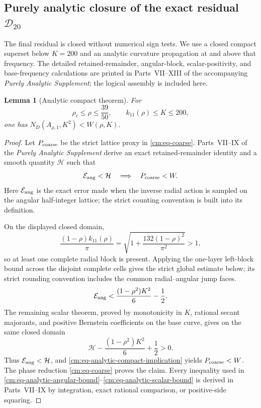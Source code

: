 \documentclass[11pt]{article}
\numberwithin{equation}{section}
\newtheorem{lemma}[theorem]{Lemma}
\theoremstyle{definition}
\theoremstyle{remark}
\begin{document}
\subsection{Purely analytic closure of the exact residual
\texorpdfstring{\(\mathcal D_{20}\)}{D20}}

The final residual is closed without numerical sign tests.  We use a
closed compact superset below \(K=200\) and an analytic curvature
propagation at and above that frequency.  The detailed retained-remainder,
angular-block, scalar-positivity, and base-frequency calculations are
printed in Parts~VII--XIII of the accompanying \emph{Purely Analytic
Supplement}; the logical assembly is included here.

\begin{lemma}[Analytic compact theorem]
\label{cm:lem-compact-certificate}
For
\[
 \rho_c\leq\rho\leq\frac{39}{50},
 \qquad
 k_{11}(\rho)\leq K\leq200,
\]
one has \(N_D(A_{\rho,1},K^2)<W(\rho,K)\).
\end{lemma}

\begin{proof}
Let \(P_{\rm coarse}\) be the strict lattice proxy in
\eqref{cm:eq-coarse}.  Parts~VII--IX of the \emph{Purely Analytic
Supplement} derive an exact retained-remainder identity and a smooth
quantity \(\mathcal H\) such that
\begin{equation}
 \mathcal E_{\rm ang}<\mathcal H
 \quad\Longrightarrow\quad
 P_{\rm coarse}<W.
 \label{cm:eq-analytic-compact-implication}
\end{equation}
Here \(\mathcal E_{\rm ang}\) is the exact error made when the inverse
radial action is sampled on the angular half-integer lattice; the strict
counting convention is built into its definition.

On the displayed closed domain,
\[
 \frac{(1-\rho)k_{11}(\rho)}{\pi}
 =\sqrt{1+\frac{132(1-\rho)^2}{\pi^2}}>1,
\]
so at least one complete radial block is present.  Applying the one-layer
left-block bound across the disjoint complete cells gives the strict global
estimate below; its strict rounding convention includes the common
radial--angular jump faces.
\begin{equation}
 \mathcal E_{\rm ang}
 <\frac{(1-\rho^2)K^2}{6}-\frac12.
 \label{cm:eq-analytic-angular-bound}
\end{equation}
The remaining scalar theorem, proved by monotonicity in \(K\), rational
secant majorants, and positive Bernstein coefficients on the base curve,
gives on the same closed domain
\begin{equation}
 \mathcal H-\frac{(1-\rho^2)K^2}{6}+\frac12>0.
 \label{cm:eq-analytic-scalar-bound}
\end{equation}
Thus \(\mathcal E_{\rm ang}<\mathcal H\), and
\eqref{cm:eq-analytic-compact-implication} yields
\(P_{\rm coarse}<W\).  The phase reduction
\eqref{cm:eq-coarse} proves the claim.  Every inequality used in
\eqref{cm:eq-analytic-angular-bound}--\eqref{cm:eq-analytic-scalar-bound}
is derived in Parts~VII--IX by integration, exact rational comparison,
or positive-side squaring.
\end{proof}
\end{document}
